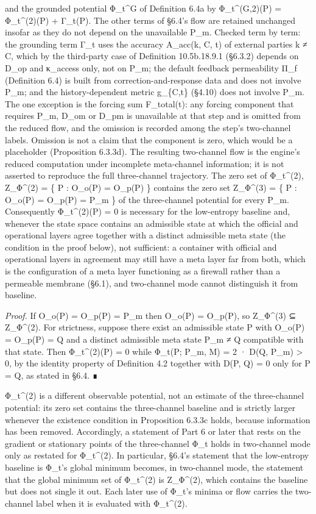 \documentclass[
]{article}
\begin{document}
and the grounded potential Φ\_t\^{}G of Definition 6.4a by
Φ\_t\^{}(G,2)(P) = Φ\_t\^{}(2)(P) + Γ\_t(P). The other terms of §6.4's
flow are retained unchanged insofar as they do not depend on the
unavailable P\_m. Checked term by term: the grounding term Γ\_t uses the
accuracy A\_acc(k, C, t) of external parties k ≠ C, which by the
third-party case of Definition 10.5b.18.9.1 (§6.3.2) depends on D\_op
and κ\_access only, not on P\_m; the default feedback permeability Π\_f
(Definition 6.4) is built from correction-and-response data and does not
involve P\_m; and the history-dependent metric g\_\{C,t\} (§4.10) does
not involve P\_m. The one exception is the forcing sum F\_total(t): any
forcing component that requires P\_m, D\_om or D\_pm is unavailable at
that step and is omitted from the reduced flow, and the omission is
recorded among the step's two-channel labels. Omission is not a claim
that the component is zero, which would be a placeholder (Proposition
6.3.3d). The resulting two-channel flow is the engine's reduced
computation under incomplete meta-channel information; it is not
asserted to reproduce the full three-channel trajectory. The zero set of
Φ\_t\^{}(2), Z\_Φ\^{}(2) = \{ P : O\_o(P) = O\_p(P) \} contains the zero
set Z\_Φ\^{}(3) = \{ P : O\_o(P) = O\_p(P) = P\_m \} of the
three-channel potential for every P\_m. Consequently Φ\_t\^{}(2)(P) = 0
is necessary for the low-entropy baseline and, whenever the state space
contains an admissible state at which the official and operational
layers agree together with a distinct admissible meta state (the
condition in the proof below), not sufficient: a container with official
and operational layers in agreement may still have a meta layer far from
both, which is the configuration of a meta layer functioning as a
firewall rather than a permeable membrane (§6.1), and two-channel mode
cannot distinguish it from baseline.

\emph{Proof.} If O\_o(P) = O\_p(P) = P\_m then O\_o(P) = O\_p(P), so
Z\_Φ\^{}(3) ⊆ Z\_Φ\^{}(2). For strictness, suppose there exist an
admissible state P with O\_o(P) = O\_p(P) = Q and a distinct admissible
meta state P\_m ≠ Q compatible with that state. Then Φ\_t\^{}(2)(P) = 0
while Φ\_t(P; P\_m, M) = 2 · D(Q, P\_m) \textgreater{} 0, by the
identity property of Definition 4.2 together with D(P, Q) = 0 only for P
= Q, as stated in §6.4. ∎

Φ\_t\^{}(2) is a different observable potential, not an estimate of the
three-channel potential: its zero set contains the three-channel
baseline and is strictly larger whenever the existence condition in
Proposition 6.3.3c holds, because information has been removed.
Accordingly, a statement of Part 6 or later that rests on the gradient
or stationary points of the three-channel Φ\_t holds in two-channel mode
only as restated for Φ\_t\^{}(2). In particular, §6.4's statement that
the low-entropy baseline is Φ\_t's global minimum becomes, in
two-channel mode, the statement that the global minimum set of
Φ\_t\^{}(2) is Z\_Φ\^{}(2), which contains the baseline but does not
single it out. Each later use of Φ\_t's minima or flow carries the
two-channel label when it is evaluated with Φ\_t\^{}(2).
\end{document}
